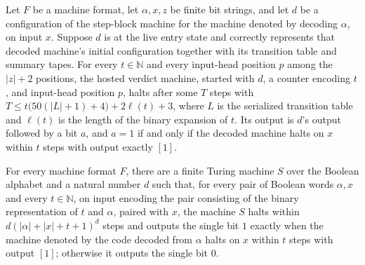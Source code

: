 \begin{theorem}
\label{Turing.MachineFormat.h1HostedVerdict_accepts}
\leanok
{}
Let $F$ be a machine format, let $\alpha,x,z$ be finite bit strings, and let $d$ be a
configuration of the step-block machine for the machine denoted by decoding $\alpha$, on
input $x$. Suppose $d$ is at the live entry state and correctly represents that decoded
machine's initial configuration together with its transition table and summary tapes.
For every $t\in\mathbb N$ and every input-head position $p$ among the $|z|+2$ positions,
the hosted verdict machine, started with $d$, a counter encoding $t$, and input-head
position $p$, halts after some $T$ steps with $T\le
t\bigl(50(|L|+1)+4\bigr)+2\ell(t)+3$, where $L$ is the serialized transition table and
$\ell(t)$ is the length of the binary expansion of $t$. Its output is $d$'s output
followed by a bit $a$, and $a=1$ if and only if the decoded machine halts on $x$ within
$t$ steps with output exactly $[1]$.
\end{theorem}

\begin{theorem}
\label{Turing.MachineFormat.exists_uniformSimulator}
\leanok
{}
For every machine format $F$, there are a finite Turing machine $S$ over the Boolean
alphabet and a natural number $d$ such that, for every pair of Boolean words $\alpha,x$
and every $t\in\mathbb N$, on input encoding the pair consisting of the binary
representation of $t$ and $\alpha$, paired with $x$, the machine $S$ halts within
$d(|\alpha|+|x|+t+1)^d$ steps and outputs the single bit $1$ exactly when the machine
denoted by the code decoded from $\alpha$ halts on $x$ within $t$ steps with output
$[1]$; otherwise it outputs the single bit $0$.
\end{theorem}
